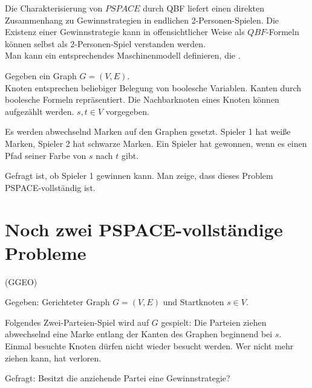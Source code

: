 Die Charakterisierung von $PSPACE$ durch QBF liefert einen direkten Zusammenhang zu Gewinnstrategien in endlichen 2-Personen-Spielen.
Die Existenz einer Gewinnstrategie kann in offensichtlicher Weise als $QBF$-Formeln können selbst als 2-Personen-Spiel verstanden werden.
\\
Man kann ein entsprechendes Maschinenmodell definieren, die .






\begin{beispiel}
    

    Gegeben ein Graph $G = (V,E)$.
    \\
    Knoten entsprechen beliebiger Belegung von boolesche Variablen. Kanten durch boolesche Formeln repräsentiert. Die Nachbarknoten eines Knoten können aufgezählt werden. $s, t \in V$ vorgegeben.

    Es werden abwechselnd Marken auf den Graphen gesetzt. Spieler 1 hat weiße Marken, Spieler 2 hat schwarze Marken. Ein Spieler hat gewonnen, wenn es einen Pfad seiner Farbe von $s$ nach $t$ gibt.

    Gefragt ist, ob Spieler 1 gewinnen kann. Man zeige, dass dieses Problem PSPACE-vollständig ist.

\end{beispiel}
















\section{Noch zwei PSPACE-vollständige Probleme}


\begin{definition}
    
     (GGEO)

    Gegeben: Gerichteter Graph $G = (V, E)$ und Startknoten $s \in V$.

    Folgendes Zwei-Parteien-Spiel wird auf $G$ gespielt: Die Parteien ziehen abwechselnd eine Marke entlang der Kanten des Graphen beginnend bei $s$. Einmal besuchte Knoten dürfen nicht wieder besucht werden. Wer nicht mehr ziehen kann, hat verloren.

    Gefragt: Besitzt die anziehende Partei eine Gewinnstrategie?

\end{definition}


